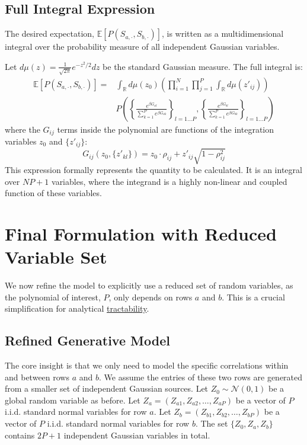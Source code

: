 \documentclass[12pt]{article}
\begin{document}
\subsection{Full Integral Expression}
The desired expectation, $\mathbb{E}[P(S_{a, \cdot}, S_{b, \cdot})]$, is written as a multidimensional integral over the probability measure of all independent Gaussian variables.

Let $d\mu(z) = \frac{1}{\sqrt{2\pi}} e^{-z^2/2} dz$ be the standard Gaussian measure. The full integral is:
\begin{align*}
\mathbb{E}[P(S_{a, \cdot}, S_{b, \cdot})] = & \int_{\mathbb{R}} d\mu(z_0) \left( \prod_{i=1}^{N} \prod_{j=1}^{P} \int_{\mathbb{R}} d\mu(z'_{ij}) \right) \\
& P\left( \left\{ \frac{e^{\beta G_{al}}}{\sum_{k=1}^{P} e^{\beta G_{ak}}} \right\}_{l=1 \dots P}, \left\{ \frac{e^{\beta G_{bl}}}{\sum_{k=1}^{P} e^{\beta G_{bk}}} \right\}_{l=1 \dots P} \right)
\end{align*}
where the $G_{ij}$ terms inside the polynomial are functions of the integration variables $z_0$ and $\{z'_{ij}\}$:
\[
G_{ij}(z_0, \{z'_{kl}\}) = z_0 \cdot \rho_{ij} + z'_{ij} \sqrt{1 - \rho_{ij}^2}
\]
This expression formally represents the quantity to be calculated. It is an integral over $NP+1$ variables, where the integrand is a highly non-linear and coupled function of these variables.

\section{Final Formulation with Reduced Variable Set}

We now refine the model to explicitly use a reduced set of random variables, as the polynomial of interest, $P$, only depends on rows $a$ and $b$. This is a crucial simplification for analytical \underline{tractability}.

\subsection{Refined Generative Model}
The core insight is that we only need to model the specific correlations within and between rows $a$ and $b$. We assume the entries of these two rows are generated from a smaller set of independent Gaussian sources.
Let $Z_0 \sim \mathcal{N}(0,1)$ be a global random variable as before.
Let $Z_a = (Z_{a1}, Z_{a2}, \dots, Z_{aP})$ be a vector of $P$ i.i.d. standard normal variables for row $a$.
Let $Z_b = (Z_{b1}, Z_{b2}, \dots, Z_{bP})$ be a vector of $P$ i.i.d. standard normal variables for row $b$.
The set $\{Z_0, Z_a, Z_b\}$ contains $2P+1$ independent Gaussian variables in total.
\end{document}
